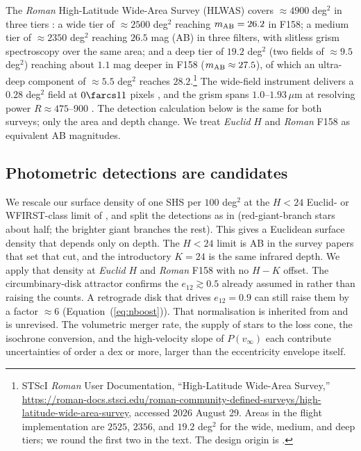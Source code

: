 \documentclass[twocolumn]{aastex701}
\newcommand{\vinf}{v_{\infty}}
\begin{document}
The \textit{Roman} High-Latitude Wide-Area Survey (HLWAS) covers
$\approx4900$ deg$^{2}$ in three tiers : a wide tier of
$\approx2500$ deg$^{2}$ reaching $m_{\rm AB}=26.2$ in F158; a medium tier of
$\approx2350$ deg$^{2}$ reaching $26.5$ mag (AB) in three filters,
with slitless grism spectroscopy over the same area; and a deep tier of
$19.2$ deg$^{2}$ (two fields of $\approx9.5$ deg$^{2}$) reaching about $1.1$ mag
deeper in F158 ($m_{\rm AB}\approx27.5$),
of which an ultra-deep component of $\approx5.5$ deg$^{2}$ reaches $28.2$.\footnote{STScI
\textit{Roman} User Documentation, ``High-Latitude Wide-Area Survey,''
\url{https://roman-docs.stsci.edu/roman-community-defined-surveys/high-latitude-wide-area-survey},
accessed 2026 August 29. Areas in the flight implementation are $2525$, $2356$,
and $19.2$ deg$^{2}$ for the wide, medium, and deep tiers; we round the first
two in the text. The design origin is .}
The
wide-field instrument delivers a $0.28$ deg$^{2}$ field at $0\farcs11$
pixels \citep{akeson19}, and the grism spans $1.0$--$1.93\,\mu$m at resolving
power $R\approx475$--900 \citep{bray24}. The detection calculation below is
the same for both surveys; only the area and depth change. We treat
\textit{Euclid} $H$ and \textit{Roman} F158 as equivalent AB magnitudes.

\subsection{Photometric detections are candidates}

We rescale our surface density of one SHS per $100$ deg$^{2}$ at the $H<24$
Euclid- or WFIRST-class limit of , and split the detections
as in  (red-giant-branch stars about half; the brighter giant
branches the rest). This gives a Euclidean surface density that depends only
on depth. The $H<24$ limit is AB in the survey papers that set that cut, and
the introductory $K=24$ is the same infrared depth. We apply that density at \textit{Euclid}
$H$ and \textit{Roman} F158 with no $H-K$ offset. The circumbinary-disk
attractor confirms the $e_{12}\gtrsim0.5$ already assumed in
 rather than raising the counts. A retrograde disk that drives
$e_{12}=0.9$ can still raise them by a factor $\approx6$
(Equation~(\ref{eq:nboost})). That normalisation is inherited from
 and is unrevised. The volumetric merger rate, the supply of
stars to the loss cone, the isochrone conversion, and the high-velocity slope of $P(\vinf)$ each contribute uncertainties of order a
dex or more, larger than the eccentricity envelope itself.
\end{document}
